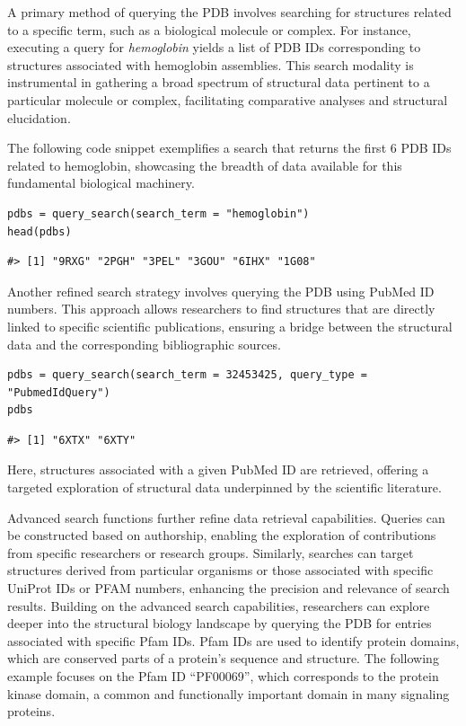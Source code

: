 A primary method of querying the PDB involves searching for structures related to a specific term, such as a biological molecule or complex. For instance, executing a query for \emph{hemoglobin} yields a list of PDB IDs corresponding to structures associated with hemoglobin assemblies. This search modality is instrumental in gathering a broad spectrum of structural data pertinent to a particular molecule or complex, facilitating comparative analyses and structural elucidation.

The following code snippet exemplifies a search that returns the first 6 PDB IDs related to hemoglobin, showcasing the breadth of data available for this fundamental biological machinery.

\begin{verbatim}
pdbs = query_search(search_term = "hemoglobin")
head(pdbs)
\end{verbatim}

\begin{verbatim}
#> [1] "9RXG" "2PGH" "3PEL" "3GOU" "6IHX" "1G08"
\end{verbatim}

Another refined search strategy involves querying the PDB using PubMed ID numbers. This approach allows researchers to find structures that are directly linked to specific scientific publications, ensuring a bridge between the structural data and the corresponding bibliographic sources.

\begin{verbatim}
pdbs = query_search(search_term = 32453425, query_type = "PubmedIdQuery")
pdbs
\end{verbatim}

\begin{verbatim}
#> [1] "6XTX" "6XTY"
\end{verbatim}

Here, structures associated with a given PubMed ID are retrieved, offering a targeted exploration of structural data underpinned by the scientific literature.

Advanced search functions further refine data retrieval capabilities. Queries can be constructed based on authorship, enabling the exploration of contributions from specific researchers or research groups. Similarly, searches can target structures derived from particular organisms or those associated with specific UniProt IDs or PFAM numbers, enhancing the precision and relevance of search results. Building on the advanced search capabilities, researchers can explore deeper into the structural biology landscape by querying the PDB for entries associated with specific Pfam IDs. Pfam IDs are used to identify protein domains, which are conserved parts of a protein's sequence and structure. The following example focuses on the Pfam ID ``PF00069'', which corresponds to the protein kinase domain, a common and functionally important domain in many signaling proteins.

